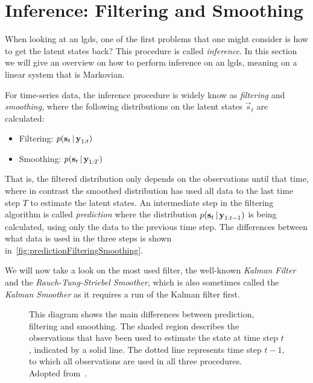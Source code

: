 \section{Inference: Filtering and Smoothing}
	\label{sec:filteringSmoothing}

	When looking at an \ac{lgds}, one of the first problems that one might consider is how to get the latent states back? This procedure is called \emph{inference}. In this section we will give an overview on how to perform inference on an \ac{lgds}, meaning on a linear system that is Markovian.

	For time-series data, the inference procedure is widely know as \emph{filtering} and \emph{smoothing}, where the following distributions on the latent states \( \vec{s}_t \) are calculated:
	\begin{itemize}
		\item Filtering: \tabto{2.5cm} \( p(\boldsymbol{\mathrm{s}}_t \,\vert\, \boldsymbol{\mathrm{y}}_{1:t}) \)
		\item Smoothing: \tabto{2.5cm} \( p(\boldsymbol{\mathrm{s}}_t \,\vert\, \boldsymbol{\mathrm{y}}_{1:T}) \)
	\end{itemize}
	That is, the filtered distribution only depends on the observations until that time, where in contrast the smoothed distribution has used all data to the last time step \(T\) to estimate the latent states. An intermediate step in the filtering algorithm is called \emph{prediction} where the distribution \( p(\boldsymbol{\mathrm{s}}_t \,\vert\, \boldsymbol{\mathrm{y}}_{1:t - 1}) \) is being calculated, using only the data to the previous time step. The differences between what data is used in the three steps is shown in~\autoref{fig:predictionFilteringSmoothing}.

	We will now take a look on the most used filter, the well-known \emph{Kalman Filter} and the \emph{Rauch-Tung-Striebel Smoother}, which is also sometimes called the \emph{Kalman Smoother} as it requires a run of the Kalman filter first.

	\begin{figure}
		\centering
		\tikzPredictionFilteringSmoothing
		\caption[Illustration of the differences between prediction, filtering and smoothing]{This diagram shows the main differences between prediction, filtering and smoothing. The shaded region describes the observations that have been used to estimate the state at time step \(t\), indicated by a solid line. The dotted line represents time step \(t - 1\), to which all observations are used in all three procedures. \\ Adopted from~\cite{solinCubatureIntegrationMethods2010}.}
		\label{fig:predictionFilteringSmoothing}
	\end{figure}

